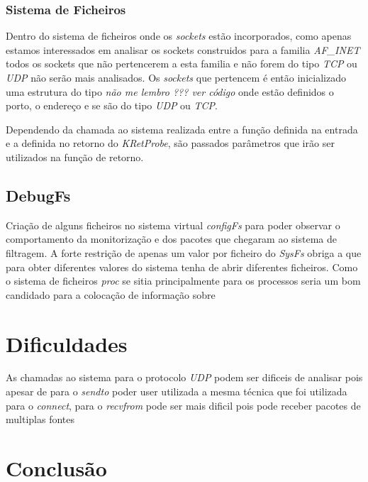 \subsubsection{Sistema de Ficheiros}

Dentro do sistema de ficheiros onde os \textit{sockets} estão incorporados, como apenas estamos interessados em analisar os sockets construidos para a
familia \textit{AF\_INET} todos os sockets que não pertencerem a esta familia e não forem do tipo \textit{TCP} ou \textit{UDP} não serão mais analisados.
 Os \textit{sockets} que pertencem é então inicializado uma estrutura do tipo \textit{não me lembro ??? ver código} onde estão definidos o porto, o endereço
e se são do tipo \textit{UDP} ou \textit{TCP}.

Dependendo da chamada ao sistema realizada entre a função definida na entrada e a definida no retorno do \textit{KRetProbe}, são passados parâmetros que irão
ser utilizados na função de retorno.


\subsection{DebugFs}
Criação de alguns ficheiros no sistema virtual \textit{configFs} para poder observar o comportamento da monitorização e dos pacotes que chegaram ao sistema de filtragem.
A forte restrição de apenas um valor por ficheiro do \textit{SysFs} obriga a que para obter diferentes valores do sistema tenha de abrir diferentes ficheiros.
 Como o sistema de ficheiros \textit{proc} se sitia principalmente para os processos seria um bom candidado para a colocação de informação sobre 


\section{Dificuldades}
 As chamadas ao sistema para o protocolo \textit{UDP} podem ser dificeis de analisar pois apesar de para o \textit{sendto} poder user utilizada a mesma técnica que foi utilizada para o \textit{connect}, para o \textit{recvfrom} pode ser mais dificil pois pode receber pacotes de multiplas fontes

\section{Conclusão}
\label{sec:implement_conclusion}
